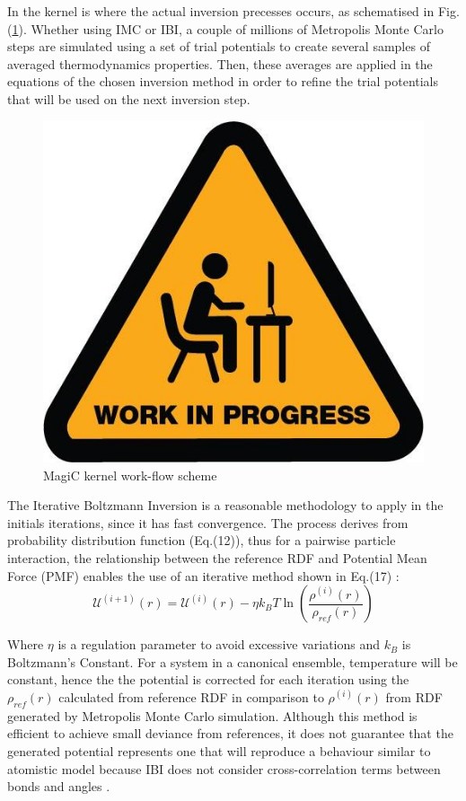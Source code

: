 \documentclass[10pt,a4paper,twoside]{article}
\begin{document}
 In the kernel is where the actual inversion precesses occurs, as schematised in Fig.(\ref{Fig:kernel}). Whether using IMC or IBI, a couple of millions of Metropolis Monte Carlo steps are simulated using a set of trial potentials to create several samples of averaged thermodynamics properties. Then, these averages are applied in the equations of the chosen inversion method in order to refine the trial potentials that will be used on the next inversion step.
 \begin{figure}[ht!]
  \begin{center}
	\includegraphics[width=0.3 \textwidth]{./images/wip}
	\caption{MagiC kernel work-flow scheme}
	\label{Fig:kernel}
  \end{center}
\end{figure}
 
 The Iterative Boltzmann Inversion is a reasonable methodology to apply in the initials iterations, since it has fast convergence. The process derives from probability distribution function (Eq.(12)), thus for a pairwise particle interaction, the relationship between the reference RDF and Potential Mean Force (PMF) enables the use of an iterative method shown in Eq.(17) \cite{ibi}:
   \begin{equation}
\mathcal{U}^{(i+1)}(r) = \mathcal{U}^{(i)}(r) - \eta k_B T \ln{\left(\dfrac{\rho^{(i)}(r)}{\rho_{ref}(r)}\right)}
\label{eqn:ibi}
\end{equation}

 Where $\eta$ is a regulation parameter to avoid excessive variations and $k_B$ is Boltzmann's Constant. For a system in a canonical ensemble, temperature will be constant, hence the the potential is corrected for each iteration using the $\rho_{ref}(r)$ calculated from reference RDF in comparison to $\rho^{(i)}(r)$ from  RDF generated by Metropolis Monte Carlo simulation. Although this method is efficient to achieve small deviance from references, it does not guarantee that the generated potential represents one that will reproduce a behaviour similar to atomistic model because IBI does not consider cross-correlation terms between bonds and angles \cite{magic}.   
 
\end{document}

